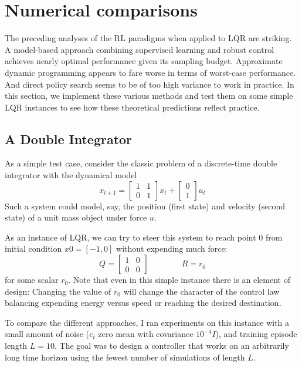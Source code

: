 \documentclass[11pt]{article}
\numberwithin{equation}{section}
\begin{document}
\section{Numerical comparisons}

The preceding analyses of the RL paradigms when applied to LQR are striking. A model-based approach combining supervised learning and robust control achieves nearly optimal performance given its sampling budget. Approximate dynamic programming appears to fare worse in terms of worst-case performance. And direct policy search seems to be of too high variance to work in practice. In this section, we implement these various methods and test them on some simple LQR instances to see how these theoretical predictions reflect practice.

\subsection{A Double Integrator}

As a simple test case, consider the classic problem of a discrete-time double integrator with the dynamical model
\begin{equation}\label{eq:double-int-dynamics}
    x_{t+1} = \begin{bmatrix} 1 & 1 \\ 0 & 1 \end{bmatrix} x_t
    + \begin{bmatrix} 0 \\ 1 \end{bmatrix} u_t
\end{equation}
Such a system could model, say, the position (first state) and velocity (second state) of a unit mass object under force $u$.

As an instance of LQR, we can try to steer this system to reach point $0$ from initial condition $x0 = [-1,0]$ without expending much force:
\begin{equation}\label{eq:double-int-cost}
    Q = \begin{bmatrix} 1 & 0 \\ 0 & 0 \end{bmatrix} \qquad\qquad R = r_0
\end{equation}
for some scalar $r_0$.  Note that even in this simple instance there is an element of design: Changing the value of $r_0$ will change the character of the control law balancing expending energy versus speed or reaching the desired destination.

To compare the different approaches, I ran experiments on this instance with a small amount of noise ($e_t$ zero mean with covariance $10^{-4} I$), and training episode length $L=10$. The goal was to design a controller that works on an arbitrarily long time horizon using the fewest number of simulations of length $L$.
\end{document}
